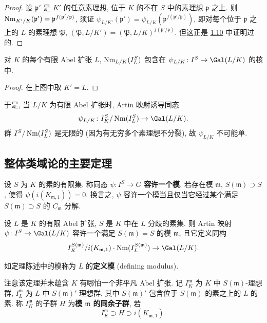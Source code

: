 \begin{proof}
设 $\mathfrak{p}'$ 是 $K'$ 的任意素理想, 位于 $K$ 的不在 $S$ 中的素理想 $\mathfrak{p}$ 之上. 则 $\operatorname{Nm}_{K'/K}(\mathfrak{p}')=\mathfrak{p}^{f(\mathfrak{p}'/\mathfrak{p})}$, 须证 $\psi_{L/K'}(\mathfrak{p}')=\psi_{L/K}(\mathfrak{p}^{f(\mathfrak{p}'/\mathfrak{p})})$, 即对每个位于 $\mathfrak{p}$ 之上的 $L$ 的素理想 $\mathfrak{P}$, $(\mathfrak{P},L/K')=(\mathfrak{P},L/K)^{f(\mathfrak{p}'/\mathfrak{p})}$. 但这正是 \hyperlink{item:v.1.10}{1.10} 中证明过的.
\end{proof}

\begin{corollary}\label{cor:v.3.4}
对 $K$ 的每个有限 Abel 扩张 $L$, $\operatorname{Nm}_{L/K}(I_L^S)$ 包含在 $\psi_{L/K}\colon I^S\to\Gal(L/K)$ 的核中.
\end{corollary}

\begin{proof}
在上图中取 $K'=L$.
\end{proof}

于是, 当 $L/K$ 为有限 Abel 扩张时, Artin 映射诱导同态
\[
\psi_{L/K}\colon I_K^S/\Nm(I_L^S)\to\Gal(L/K).
\]
群 $I^S/\operatorname{Nm}(I_L^S)$ 是无限的 (因为有无穷多个素理想不分裂), 故 $\psi_{L/K}$ 不可能单.

\subsection*{整体类域论的主要定理}

设 $S$ 为 $K$ 的素的有限集. 称同态 $\psi\colon I^S\to G$ \textbf{容许一个模}, 若存在模 $\mathfrak{m}$, $S(\mathfrak{m})\supset S$, 使得 $\psi(i(K_{\mathfrak{m},1}))=0$. 换言之, $\psi$ 容许一个模当且仅当它经过某个满足 $S(\mathfrak{m})\supset S$ 的 $C_{\mathfrak{m}}$ 分解.

\begin{theorem}[互反律]\label{thm:v.3.5}
设 $L$ 是 $K$ 的有限 Abel 扩张, $S$ 是 $K$ 中在 $L$ 分歧的素集. 则 Artin 映射 $\psi\colon I^S\to\Gal(L/K)$ 容许一个满足 $S(\mathfrak{m})=S$ 的模 $\mathfrak{m}$, 且它定义同构
\[
I_K^{S(\mathfrak{m})}/i(K_{\mathfrak{m},1})\cdot\Nm(I_L^{S(\mathfrak{m})})\to\Gal(L/K).
\]
\end{theorem}

如定理陈述中的模称为 $L$ 的\textbf{定义模} (defining modulus).

注意该定理并未蕴含 $K$ 有哪怕一个非平凡 Abel 扩张. 记 $I_K^{\mathfrak{m}}$ 为 $K$ 中 $S(\mathfrak{m})$-理想群, $I_L^{\mathfrak{m}}$ 为 $L$ 中 $S(\mathfrak{m})'$-理想群, 其中 $S(\mathfrak{m})'$ 包含位于 $S(\mathfrak{m})$ 的素之上的 $L$ 的素. 称 $I_K^{\mathfrak{m}}$ 的子群 $H$ 为\textbf{模 $\mathfrak{m}$ 的同余子群}, 若
\[
I_K^{\mathfrak{m}}\supset H\supset i(K_{\mathfrak{m},1}).
\]

